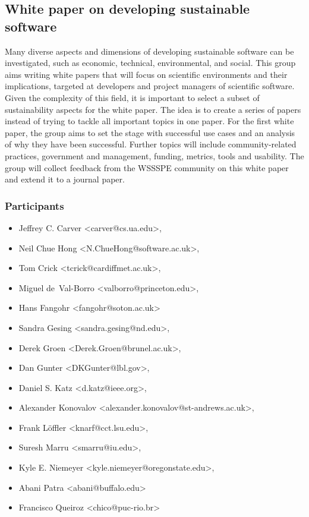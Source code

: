 \subsection{White paper on developing sustainable software}
\label{sec:best-practices-developing}



Many diverse aspects and dimensions of developing sustainable software can be investigated,
such as economic, technical, environmental, and social. This group aims writing white papers that
will focus 
on scientific environments and their implications, targeted at developers 
and project managers of scientific software. Given the complexity of this field, it is important to select
a subset of sustainability aspects for the white paper. The idea is to create a series of papers instead of trying
to tackle all important topics in one paper. For the first white paper, the group aims to set the stage with successful use cases and an analysis of why they have been successful. Further topics will include community-related practices, government and management, funding, metrics, tools and usability. The group will collect feedback from the WSSSPE community on this white paper and extend it to a journal paper.

\subsubsection{Participants}

\begin{itemize}
\item Jeffrey C. Carver <carver@cs.ua.edu>,
\item Neil Chue Hong <N.ChueHong@software.ac.uk>,
\item Tom Crick <tcrick@cardiffmet.ac.uk>,
\item Miguel de~Val-Borro <valborro@princeton.edu>,
\item Hans Fangohr <fangohr@soton.ac.uk>
\item Sandra Gesing <sandra.gesing@nd.edu>,
\item Derek Groen <Derek.Groen@brunel.ac.uk>,
\item Dan Gunter <DKGunter@lbl.gov>,
\item Daniel S. Katz <d.katz@ieee.org>,
\item Alexander Konovalov <alexander.konovalov@st-andrews.ac.uk>,
\item Frank L\"offler <knarf@cct.lsu.edu>,
\item Suresh Marru <smarru@iu.edu>,
\item Kyle E. Niemeyer <kyle.niemeyer@oregonstate.edu>,
\item Abani Patra <abani@buffalo.edu>
\item Francisco Queiroz <chico@puc-rio.br>
\end{itemize}

